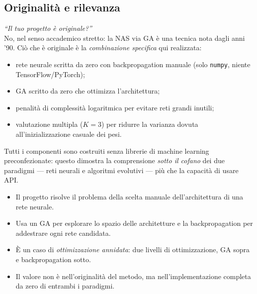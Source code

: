 \documentclass[11pt,a4paper]{article}
\newcommand{\fnt}{\texttt}     %
\begin{document}
\subsection{Originalità e rilevanza}

\begin{domanda}
\textit{``Il tuo progetto è originale?''}\\
No, nel senso accademico stretto: la NAS via GA è una tecnica nota dagli
anni '90. Ciò che è originale è la \emph{combinazione specifica} qui
realizzata:
\begin{itemize}
    \item rete neurale scritta da zero con backpropagation manuale (solo
          \fnt{numpy}, niente TensorFlow/PyTorch);
    \item GA scritto da zero che ottimizza l'architettura;
    \item penalità di complessità logaritmica per evitare reti grandi inutili;
    \item valutazione multipla ($K=3$) per ridurre la varianza dovuta
          all'inizializzazione casuale dei pesi.
\end{itemize}
Tutti i componenti sono costruiti senza librerie di machine learning
preconfezionate: questo dimostra la comprensione \emph{sotto il cofano}
dei due paradigmi --- reti neurali e algoritmi evolutivi --- più che la
capacità di usare API.
\end{domanda}

\begin{riassunto}
\begin{itemize}
    \item Il progetto risolve il problema della scelta manuale dell'architettura di una rete neurale.
    \item Usa un GA per esplorare lo spazio delle architetture e la backpropagation per addestrare ogni rete candidata.
    \item È un caso di \emph{ottimizzazione annidata}: due livelli di ottimizzazione, GA sopra e backpropagation sotto.
    \item Il valore non è nell'originalità del metodo, ma nell'implementazione completa da zero di entrambi i paradigmi.
\end{itemize}
\end{riassunto}

\newpage

\end{document}

